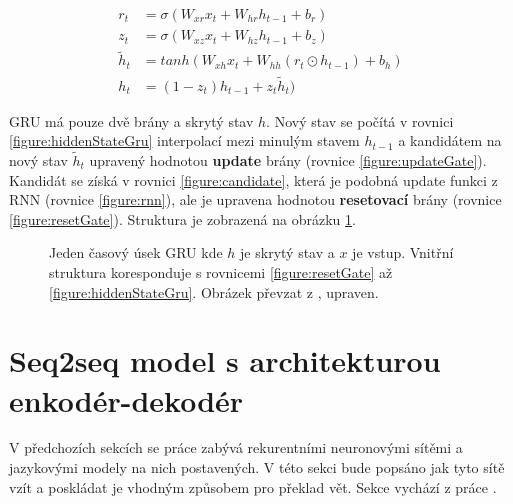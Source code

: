 \begin{align}
    r_{t}&=\sigma(W_{xr}x_{t}+W_{hr}h_{t-1}+b_{r}) \label{figure:resetGate} \\
    z_{t}&=\sigma(W_{xz}x_{t}+W_{hz}h_{t-1}+b_{z}) \label{figure:updateGate} \\
    \tilde{h}_{t}&=tanh(W_{xh}x_t + W_{hh}(r_t \odot h_{t-1}) + b_h) \label{figure:candidate} \\
    h_{t}&=(1 - z_t)h_{t-1} + z_{t}\tilde{h}_{t}) \label{figure:hiddenStateGru}
\end{align}

GRU má pouze dvě brány a skrytý stav $h$. Nový stav se počítá v rovnici \ref{figure:hiddenStateGru} interpolací mezi minulým stavem $h_{t-1}$ a kandidátem na nový stav $\tilde{h}_{t}$ upravený hodnotou \textbf{update} brány (rovnice \ref{figure:updateGate}). Kandidát se získá v rovnici \ref{figure:candidate}, která je podobná update funkci z RNN (rovnice \ref{figure:rnn}), ale je upravena hodnotou \textbf{resetovací} brány (rovnice \ref{figure:resetGate}). Struktura je zobrazená na obrázku \ref{img:GRU}.


\begin{figure}[H]
    \begin{center}
    \end{center}
	\caption{Jeden časový úsek GRU kde $h$ je skrytý stav a $x$ je vstup. Vnitřní struktura koresponduje s rovnicemi \ref{figure:resetGate} až \ref{figure:hiddenStateGru}. Obrázek převzat z \cite{understandingLSTM}, upraven.}
	\label{img:GRU}
\end{figure}

\section{Seq2seq model s architekturou enkodér-dekodér} \label{section:encoderdecoder}
V předchozích sekcích se práce zabývá rekurentními neuronovými sítěmi a jazykovými modely na nich postavených. V této sekci bude popsáno jak tyto sítě vzít a poskládat je vhodným způsobem pro překlad vět. Sekce vychází z práce \cite{nmtTutorial}.

